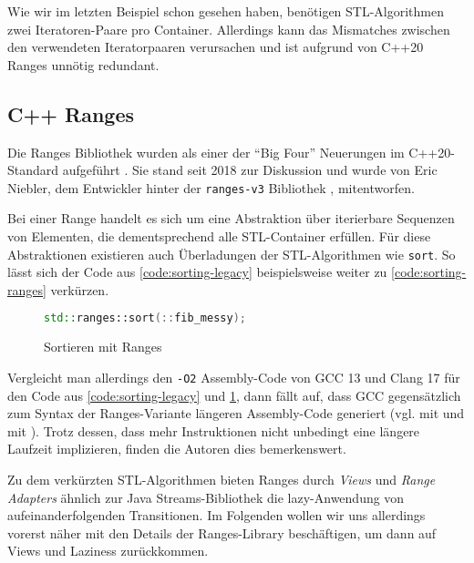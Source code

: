 \documentclass[runningheads]{llncs}
\begin{document}
\noindent Wie wir im letzten Beispiel schon gesehen haben, benötigen STL-Algorithmen zwei Iteratoren-Paare pro Container.
Allerdings kann das Mismatches zwischen den verwendeten Iteratorpaaren verursachen \cite{profcpp} und ist aufgrund von C++20 Ranges unnötig redundant.

\subsection{C++ Ranges}

Die Ranges Bibliothek wurden als einer der \enquote{Big Four} Neuerungen im C++20-Standard aufgeführt \cite{open-std.org}.
Sie stand seit 2018 zur Diskussion \cite{the-one-ranges-proposal} und wurde von Eric Niebler, dem Entwickler hinter der \texttt{ranges-v3} Bibliothek \cite{ranges-v3}, mitentworfen.

Bei einer Range handelt es sich um eine Abstraktion über iterierbare Sequenzen von Elementen, die dementsprechend alle STL-Container erfüllen.
Für diese Abstraktionen existieren auch Überladungen der STL-Algorithmen wie \texttt{sort}.
So lässt sich der Code aus \autoref{code:sorting-legacy} beispielsweise weiter zu \autoref{code:sorting-ranges} verkürzen.

\begin{figure}[H]
	\caption{Sortieren mit Ranges}
	\label{code:sorting-ranges}
	\begin{lstlisting}[language=C++]
	std::ranges::sort(::fib_messy);\end{lstlisting}
\end{figure}

\noindent Vergleicht man allerdings den \texttt{-O2} Assembly-Code von GCC 13 und Clang 17 für den Code aus \autoref{code:sorting-legacy} und \ref{code:sorting-ranges}, dann fällt auf, dass GCC gegensätzlich zum Syntax der Ranges-Variante längeren Assembly-Code generiert (vgl. \cite{compexp2:clang-leg} mit \cite{compexp2:clang-ranges} und \cite{compexp2:gcc-leg} mit \cite{compexp2:gcc-ranges}).
Trotz dessen, dass mehr Instruktionen nicht unbedingt eine längere Laufzeit implizieren, finden die Autoren dies bemerkenswert.

Zu dem verkürzten STL-Algorithmen bieten Ranges durch \textit{Views} und \textit{Range Adapters} ähnlich zur Java Streams-Bibliothek die lazy-Anwendung von aufeinanderfolgenden Transitionen.
Im Folgenden wollen wir uns allerdings vorerst näher mit den Details der Ranges-Library beschäftigen, um dann auf Views und Laziness zurückkommen.
\end{document}
